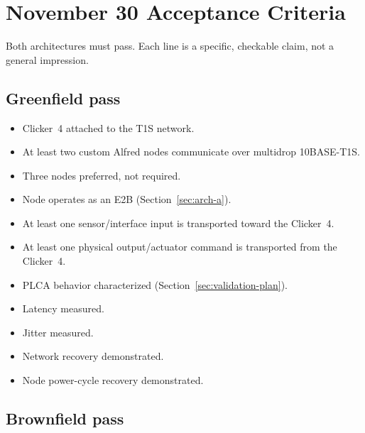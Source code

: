 \section{November 30 Acceptance Criteria}
\label{sec:exit-gate}

Both architectures must pass. Each line is a specific, checkable claim, not a general impression.

\subsection{Greenfield pass}

\begin{itemize}[itemsep=0.1em, label={$\square$}]
\item Clicker~4 attached to the T1S network.
\item At least two custom Alfred nodes communicate over multidrop 10BASE-T1S.
\item Three nodes preferred, not required.
\item Node operates as an E2B (Section~\ref{sec:arch-a}).
\item At least one sensor/interface input is transported toward the Clicker~4.
\item At least one physical output/actuator command is transported from the Clicker~4.
\item PLCA behavior characterized (Section~\ref{sec:validation-plan}).
\item Latency measured.
\item Jitter measured.
\item Network recovery demonstrated.
\item Node power-cycle recovery demonstrated.
\end{itemize}

\subsection{Brownfield pass}

